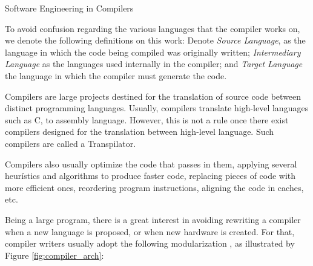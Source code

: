 \begin{section}{Software Engineering in Compilers}


To avoid confusion regarding the various languages that the compiler works on,
we denote the following definitions on this work: Denote \textit{Source
Language}, as the language in which the code being compiled was originally
written; \textit{Intermediary Language} as the languages used internally in the
compiler; and \textit{Target Language} the language in which the compiler must
generate the code.

Compilers are large projects destined for the translation of source code
between distinct programming languages. Usually, compilers translate high-level
languages such as C, to assembly language. However, this is not a rule once
there exist compilers designed for the translation between high-level language.
Such compilers are called a Transpilator.



Compilers also usually optimize the code that passes in them, applying several
heurístics and algorithms to produce faster code, replacing pieces of code with
more efficient ones, reordering program instructions, aligning the code in
caches, etc.

Being a large program, there is a great interest in avoiding rewriting a
compiler when a new language is proposed, or when new hardware is created. For
that, compiler writers usually adopt the following modularization
\citep{redhat} \citep{llvm}, as illustrated by Figure \ref{fig:compiler_arch}:


\end{section}
